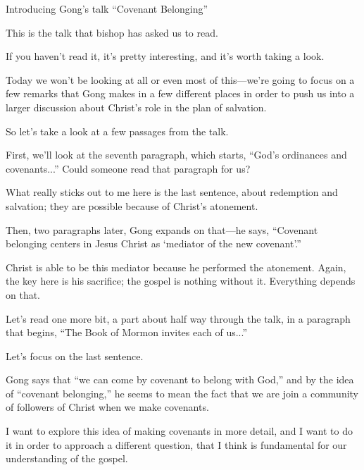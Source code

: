 		\begin{compactitem}
		
			\item Introducing Gong's talk ``Covenant Belonging''
				\begin{compactitem}
					\item This is the talk that bishop has asked us to read.
					\item If you haven't read it, it's pretty interesting, and it's worth taking a look.
					\item Today we won't be looking at all or even most of this---we're going to focus on a few remarks that Gong makes in a few different places in order to push us into a larger discussion about Christ's role in the plan of salvation.
					\item So let's take a look at a few passages from the talk.
						\begin{compactitem}
							\item First, we'll look at the seventh paragraph, which starts, ``God's ordinances and covenants...'' Could someone read that paragraph for us?
							\item What really sticks out to me here is the last sentence, about redemption and salvation; they are possible because of Christ's atonement.
							\item Then, two paragraphs later, Gong expands on that---he says, ``Covenant belonging centers in Jesus Christ as `mediator of the new covenant'.''
							\item Christ is able to be this mediator because he performed the atonement. Again, the key here is his sacrifice; the gospel is nothing without it. Everything depends on that.
							\item Let's read one more bit, a part about half way through the talk, in a paragraph that begins, ``The Book of Mormon invites each of us...''
							\item Let's focus on the last sentence.
							\item Gong says that ``we can come by covenant to belong with God,'' and by the idea of ``covenant belonging,'' he seems to mean the fact that we are join a community of followers of Christ when we make covenants. 
							\item I want to explore this idea of making covenants in more detail, and I want to do it in order to approach a different question, that I think is fundamental for our understanding of the gospel.
						\end{compactitem}
				\end{compactitem}
		

\end{compactitem}
